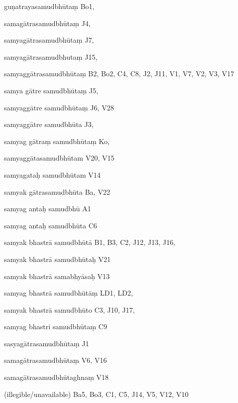 \begin{ekdosis}
\begin{marma}[hp01_055]
\begin{marma}[hp02_009]
\begin{marma}[hp02_011]
\begin{marma}[hp02_67ab]
\begin{description}
        \end{description}
\end{marma}


\begin{marma}[hp02_68a]
\item[guṇatrayasamudbhūtaṃ] Bo1,
\item[samagātrasamudbhūtaṃ] J4,
\item[samyagātrasamudbhūtaṃ] J7,
\item[samyagātrasamudbhutaṃ] J15,
\item[samyaggātrasamudbhūtaṃ] B2, Bo2, C4, C8, J2, J11, V1, V7, V2, V3, V17
\item[samya gātre samudbhūtaṃ] J5,
\item[samyaggātre samudbhūtaṃ] J6, V28
\item[samyaggātre samudbhūta] J3,
\item[samyag gātraṃ samudbhūtaṃ] Ko,
\item[samyaggātasamudbhūtam] V20, V15
\item[samyagataḥ samudbhūtam] V14
\item[samyak gātrasamudbhūta] Ba, V22
\item[samyag antaḥ samudbhū] A1
\item[samyag antaḥ samudbhūta] C6
\item[samyak bhastrā samudbhūtā] B1, B3, C2, J12, J13, J16,  
\item[samyak bhastrā samudbhūtaḥ] V21  
\item[samyak bhastrā samabhyāsaḥ] V13
\item[samyag bhastrā samudbhūtāṃ] LD1, LD2, 
\item[samyak bhastrā samudbhūto] C3, J10, J17, 
\item[samyag bhastri samudbhūtaṃ] C9
\item[sasyagātrasamudbhūtaṃ] J1
\item[samagātrasamudbhūtaṃ] V6, V16
\item[samagātrasamudbhūtaghnaṃ] V18
\item[(illegible/unavailable)] Ba5, Bo3, C1, C5, J14, V5, V12, V10
 \begin{description}

        \end{description}
\end{marma}



\end{marma}
\end{marma}
\end{marma}
\end{ekdosis}
